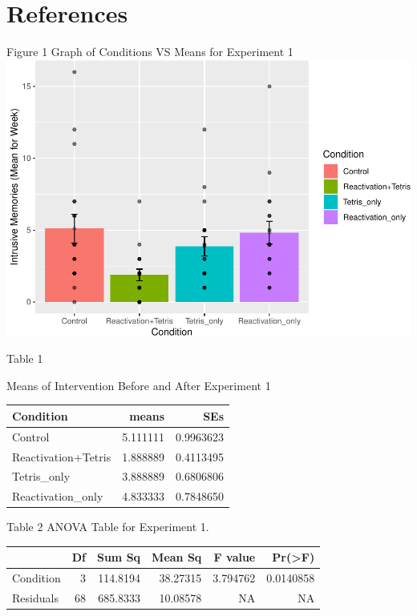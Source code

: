 \documentclass[man]{apa6}
\begin{document}
\section{References}\label{references}

\newpage

Figure 1 Graph of Conditions VS Means for Experiment 1
\includegraphics{testMidterm_files/figure-latex/unnamed-chunk-2-1.pdf}

\newpage

Table 1

Means of Intervention Before and After Experiment 1

\begin{tabular}{l|r|r}
\hline
Condition & means & SEs\\
\hline
Control & 5.111111 & 0.9963623\\
\hline
Reactivation+Tetris & 1.888889 & 0.4113495\\
\hline
Tetris\_only & 3.888889 & 0.6806806\\
\hline
Reactivation\_only & 4.833333 & 0.7848650\\
\hline
\end{tabular}

\newpage

Table 2 ANOVA Table for Experiment 1.

\begin{tabular}{l|r|r|r|r|r}
\hline
  & Df & Sum Sq & Mean Sq & F value & Pr(>F)\\
\hline
Condition & 3 & 114.8194 & 38.27315 & 3.794762 & 0.0140858\\
\hline
Residuals & 68 & 685.8333 & 10.08578 & NA & NA\\
\hline
\end{tabular}

\begingroup
\setlength{\parindent}{-0.5in} \setlength{\leftskip}{0.5in}

\hypertarget{refs}{}

\endgroup
\end{document}
